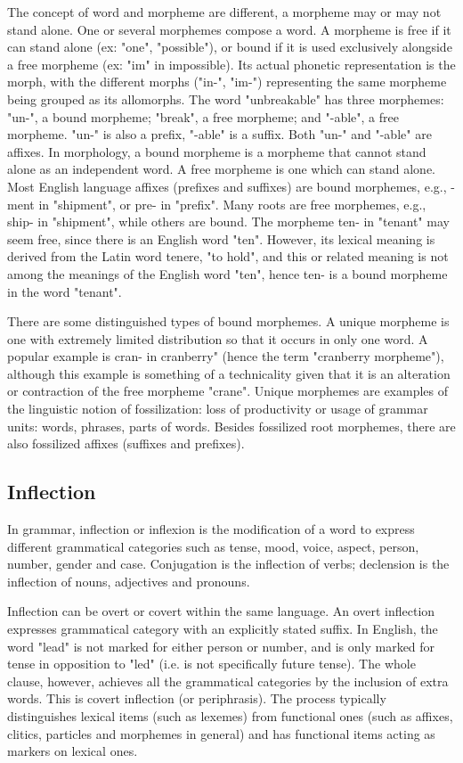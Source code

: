 The concept of word and morpheme are different, a morpheme may or may not stand alone. One or several morphemes compose a word. A morpheme is free if it can stand alone (ex: "one", "possible"), or bound if it is used exclusively alongside a free morpheme (ex: "im" in impossible). Its actual phonetic representation is the morph, with the different morphs ("in-", "im-") representing the same morpheme being grouped as its allomorphs.   The word "unbreakable" has three morphemes: "un-", a bound morpheme; "break", a free morpheme; and "-able", a free morpheme. "un-" is also a prefix, "-able" is a suffix. Both "un-" and "-able" are affixes.  In morphology, a bound morpheme is a morpheme that cannot stand alone as an independent word. A free morpheme is one which can stand alone.  Most English language affixes (prefixes and suffixes) are bound morphemes, e.g., -ment in "shipment", or pre- in "prefix".  Many roots are free morphemes, e.g., ship- in "shipment", while others are bound. The morpheme ten- in "tenant" may seem free, since there is an English word "ten". However, its lexical meaning is derived from the Latin word tenere, "to hold", and this or related meaning is not among the meanings of the English word "ten", hence ten- is a bound morpheme in the word "tenant".

There are some distinguished types of bound morphemes.  A  unique morpheme is one with extremely limited distribution so that it occurs in only one word. A popular example is cran- in cranberry" (hence the term "cranberry morpheme"), although this example is something of a technicality given that it is an alteration or contraction of the free morpheme "crane".  Unique morphemes are examples of the linguistic notion of fossilization: loss of productivity or usage of grammar units: words, phrases, parts of words. Besides fossilized root morphemes, there are also fossilized affixes (suffixes and prefixes).

\subsection{Inflection}
In grammar, inflection or inflexion is the modification of a word to express different grammatical categories such as tense, mood, voice, aspect, person, number, gender and case. Conjugation is the inflection of verbs; declension is the inflection of nouns, adjectives and pronouns.

Inflection can be overt or covert within the same language. An overt inflection expresses grammatical category with an explicitly stated suffix. In English, the word "lead" is not marked for either person or number, and is only marked for tense in opposition to "led" (i.e. is not specifically future tense). The whole clause, however, achieves all the grammatical categories by the inclusion of extra words. This is covert inflection (or periphrasis).  The process typically distinguishes lexical items (such as lexemes) from functional ones (such as affixes, clitics, particles and morphemes in general) and has functional items acting as markers on lexical ones.

